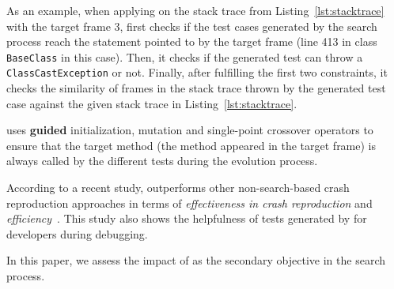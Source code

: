 As an example, when applying \evocrash on the stack trace from Listing~\ref{lst:stacktrace} with the target frame 3, \WS first checks if the test cases generated by the search process reach the statement pointed to by the target frame (line 413 in class \texttt{BaseClass} in this case). Then, it checks if the generated test can throw a \texttt{ClassCastException} or not. Finally, after fulfilling the first two constraints, it checks the similarity of frames in the stack trace thrown by the generated test case against the given stack trace in Listing~\ref{lst:stacktrace}. 


\evocrash uses \textbf{guided} initialization, mutation and single-point crossover operators to ensure that the target method  (\ie the method appeared in the target frame) is always called by the different tests during the evolution process. 


According to a recent study, \evocrash outperforms other non-search-based crash reproduction approaches in terms of \textit{effectiveness in crash reproduction} and \textit{efficiency}~\cite{Soltani2018a}. This study also shows the helpfulness of tests generated by \evocrash for developers during debugging. 

In this paper, we assess the impact of \bbc as the secondary objective in the \evocrash search process.


